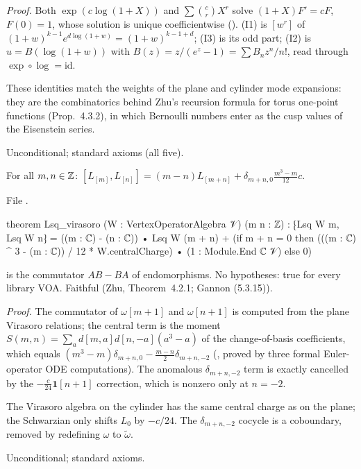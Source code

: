 \noindent\emph{Proof.} Both $\exp(c\log(1+X))$ and $\sum\binom crX^r$ solve $(1+X)F' = cF$, $F(0) = 1$, whose solution is
unique coefficientwise (). (I1) is $[w^r]$ of $(1+w)^{k-1}e^{d\log(1+w)} = (1+w)^{k-1+d}$; (I3) is its
odd part; (I2) is $u = B(\log(1+w))$ with $B(z) = z/(e^z-1) = \sum B_nz^n/n!$, read through $\exp\circ\log = \mathrm{id}$.
\begin{physics}
These identities match the weights of the plane and cylinder mode expansions: they are the combinatorics behind Zhu's
recursion formula for torus one-point functions (Prop.~4.3.2), in which Bernoulli numbers enter as the cusp values of the
Eisenstein series.
\end{physics}
\begin{status}
Unconditional; standard axioms (all five).
\end{status}

\begin{theorem}\label{l14:thm:Lsq}
For all $m,n\in{\mathbb{Z}}$: $[L_{[m]},L_{[n]}] = (m-n)L_{[m+n]} + \delta_{m+n,0}\frac{m^3-m}{12}c$.
\end{theorem}
\noindent File .
\begin{leancode}
theorem Lsq_virasoro (W : VertexOperatorAlgebra 𝒱) (m n : ℤ) :
    ⁅Lsq W m, Lsq W n⁆
      = ((m : ℂ) - (n : ℂ)) • Lsq W (m + n)
        + (if m + n = 0 then (((m : ℂ) ^ 3 - (m : ℂ)) / 12 * W.centralCharge)
             • (1 : Module.End ℂ 𝒱) else 0)
\end{leancode}
\begin{dictionary}
 is the commutator $AB - BA$ of endomorphisms. No hypotheses: true for every library VOA. Faithful (Zhu,
Theorem~4.2.1; Gannon (5.3.15)).
\end{dictionary}
\noindent\emph{Proof.} The commutator of $\omega[m+1]$ and $\omega[n+1]$ is computed from the plane Virasoro relations; the
central term is the moment $S(m,n) = \sum_ad[m,a]d[n,-a](a^3-a)$ of the change-of-basis coefficients, which equals
$(m^3-m)\delta_{m+n,0} - \frac{m-n}2\delta_{m+n,-2}$ (, proved by three formal Euler-operator
ODE computations). The anomalous $\delta_{m+n,-2}$ term is exactly cancelled by the $-\frac c{24}\mathbf 1[n+1]$ correction,
which is nonzero only at $n=-2$.
\begin{physics}
The Virasoro algebra on the cylinder has the same central charge as on the plane; the Schwarzian only shifts $L_0$ by $-c/24$.
The $\delta_{m+n,-2}$ cocycle is a coboundary, removed by redefining $\omega$ to $\tilde\omega$.
\end{physics}
\begin{status}
Unconditional; standard axioms.
\end{status}

